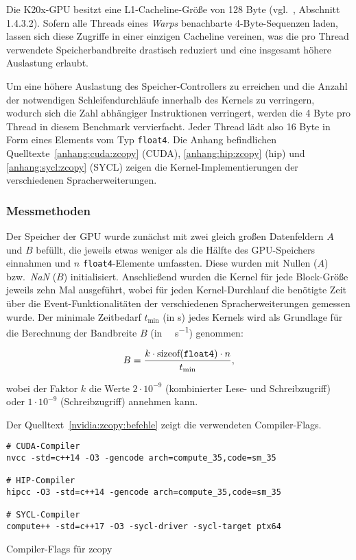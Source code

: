 Die K20x-GPU besitzt eine L1-Cacheline-Größe von \num{128} Byte
(vgl.~\cite{pascalguide}, Abschnitt 1.4.3.2). Sofern alle Threads eines
\textit{Warps} benachbarte \num{4}-Byte-Sequenzen laden, lassen sich diese
Zugriffe in einer einzigen Cacheline vereinen, was die pro Thread verwendete
Speicherbandbreite drastisch reduziert und eine insgesamt höhere Auslastung
erlaubt.

Um eine höhere Auslastung des Speicher-Controllers zu erreichen und die Anzahl
der notwendigen Schleifendurchläufe innerhalb des Kernels zu verringern, wodurch
sich die Zahl abhängiger Instruktionen verringert, werden die \num{4} Byte pro
Thread in diesem Benchmark vervierfacht. Jeder Thread lädt also \num{16} Byte in
Form eines Elements vom Typ \texttt{float4}. Die Anhang befindlichen
Quelltexte~\ref{anhang:cuda:zcopy} (CUDA), \ref{anhang:hip:zcopy} (\gls{hip})
und \ref{anhang:sycl:zcopy} (SYCL) zeigen die Kernel-Implementierungen der
verschiedenen Spracherweiterungen.

\subsubsection{Messmethoden}
\label{nvidia:zcopy:methoden}

Der Speicher der GPU wurde zunächst mit zwei gleich großen Datenfeldern $A$ und
$B$ befüllt, die jeweils etwas weniger als die Hälfte des GPU-Speichers
einnahmen und $n$ \texttt{float4}-Elemente umfassten. Diese wurden mit Nullen
($A$) bzw.\ \textit{NaN} ($B$) initialisiert. Anschließend wurden die Kernel für
jede Block-Größe jeweils zehn Mal ausgeführt, wobei für jeden Kernel-Durchlauf
die benötigte Zeit über die Event-Funktionalitäten der verschiedenen
Spracherweiterungen gemessen wurde. Der minimale Zeitbedarf $t_{\text{min}}$
(in \si{\second}) jedes Kernels wird als Grundlage für die Berechnung der
Bandbreite $B$ (in \si{\gibi\byte\per\second}) genommen:

\[
    B = \frac{k \cdot \text{sizeof(\texttt{float4})} \cdot n}{t_\text{min}},
\]

wobei der Faktor $k$ die Werte $2 \cdot 10^{-9}$ (kombinierter Lese- und
Schreibzugriff) oder $1 \cdot 10^{-9}$ (Schreibzugriff) annehmen kann.

Der Quelltext~\ref{nvidia:zcopy:befehle} zeigt die verwendeten Compiler-Flags.

\begin{code}
    \begin{verbatim}
# CUDA-Compiler
nvcc -std=c++14 -O3 -gencode arch=compute_35,code=sm_35

# HIP-Compiler
hipcc -O3 -std=c++14 -gencode arch=compute_35,code=sm_35

# SYCL-Compiler
compute++ -std=c++17 -O3 -sycl-driver -sycl-target ptx64
    \end{verbatim}
    \caption{Compiler-Flags für zcopy}
    \label{nvidia:zcopy:befehle}
\end{code}

